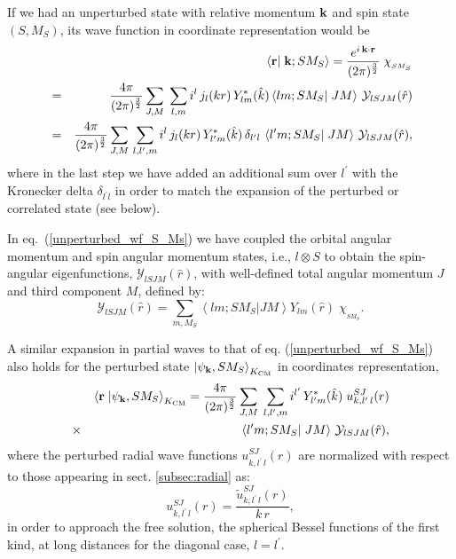 \documentclass[aps,twocolumn,showpacs,preprintnumbers,amsmath,amssymb,nofootinbib,superscriptaddress,showkeys,noeprint]{revtex4-1}
\newcommand{\nk}{{\bf k}}
\newcommand{\nr}{{\bf r}}
\begin{document}
If we had an unperturbed state with relative momentum $\nk$ and spin
state $(S,M_S)$, its wave function in coordinate representation would
be
\begin{eqnarray}
&&\left\langle \nr \right| \left. \nk; S M_S\right\rangle =
\frac{e^{i\, \nk \cdot \nr}}{(2\pi)^{\frac32}}\; \chi_{{}_{S M_S}}
\nonumber\\
&=&\frac{4\pi}{(2\pi)^{\frac32}}\sum_{J,M}\; 
\sum_{l,m} 
i^{l}\, 
j_{l}(kr)\,
Y^*_{l m}(\hat{k})
\left\langle lm; S M_S\right| \left. J M \right\rangle\,
\mathcal{Y}_{l S J M} (\hat{r}) \nonumber\\
&=&\frac{4\pi}{(2\pi)^{\frac32}}\sum_{J,M}\,
\sum_{l,l^\prime,m} 
i^{l}\, j_{l}(kr)\, Y^*_{l^\prime m}(\hat{k})\,\delta_{l^\prime l}\,
\left\langle l^\prime m; S M_S\right| \left. J M \right\rangle\,
\mathcal{Y}_{l S J M} (\hat{r}), \nonumber\\
 \label{unperturbed_wf_S_Ms}
\end{eqnarray}
where in the last step we have added an additional sum over $l^\prime$
with the Kronecker delta $\delta_{l^\prime l}$ in order to match the
expansion of the perturbed or correlated state (see below).

In eq.~(\ref{unperturbed_wf_S_Ms}) we have coupled the orbital angular
momentum and spin angular momentum states, i.e., $l\otimes S$ to
obtain the spin-angular eigenfunctions, $\mathcal{Y}_{lSJM}(\hat{r})$,
with well-defined total angular momentum $J$ and third component $M$,
defined by:
\begin{equation}\label{angular-spin_eigenfunctions}
\mathcal{Y}_{l S J M} (\hat{r})=\sum_{m, M_S}
\left\langle l m; S M_S\right| \left. J M \right\rangle
Y_{lm}(\hat{r})\; \chi_{{}_{S M_S}}.
\end{equation}

A similar expansion in partial waves to that of eq.
(\ref{unperturbed_wf_S_Ms}) also holds for the perturbed state $\left|
\psi_{\nk}, S M_S \right\rangle_{K_{\rm CM}}$ in coordinates
representation,
\begin{eqnarray}
&&\left\langle \nr \right. \left| \psi_{\nk}, S M_S \right\rangle_{K_{\rm CM}}
= \frac{4\pi}{(2\pi)^{\frac32}}\sum_{J,M}\; 
\sum_{l,l^\prime,m} i^{l^\prime}\, Y^*_{l^\prime m}(\hat{k})\;
 u^{SJ}_{k,l^\prime\,l}(r) \nonumber\\
&\times&
\left\langle l^\prime m; S M_S\right| \left. J M \right\rangle\,
\mathcal{Y}_{l S J M} (\hat{r}), \label{perturbed_wf_S_Ms}
\end{eqnarray}
where the perturbed radial wave functions $u_{k,l^\prime \,
  l}^{SJ}(r)$ are normalized with respect to those appearing in sect.
\ref{subsec:radial} as:
\begin{equation}\label{normalization_radial_wf}
u_{k,l^\prime \, l}^{SJ}(r)=\frac{\widetilde{u}^{SJ}_{k, l^\prime\,l}(r)}{k\,r},
\end{equation}
in order to approach the free solution, the spherical Bessel functions
of the first kind, at long distances for the diagonal case,
$l=l^\prime$.
\end{document}
